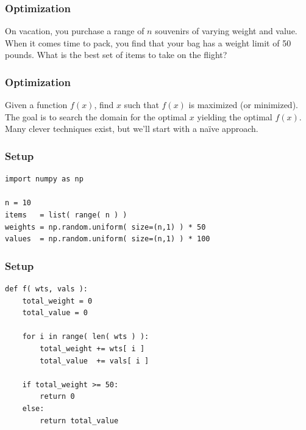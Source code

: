 \documentclass[11pt]{beamer}
\begin{document}
\begin{frame}[fragile]
  \frametitle{Optimization}
  \Enlarge

  On vacation, you purchase a range of $n$ souvenirs of varying weight and value.  When it comes time to pack, you find that your bag has a weight limit of 50 pounds.  What is the best set of items to take on the flight?
\end{frame}

\begin{frame}[fragile]
  \frametitle{Optimization}
  \Enlarge

  \begin{enumerate}
  \myitem  Given a function $f(x)$, find $x$ such that $f(x)$ is maximized (or minimized).
  \myitem  The goal is to search the domain for the optimal $x$ yielding the optimal $f(x)$.
  \myitem  Many clever techniques exist, but we'll start with a na\"{i}ve approach.
  \end{enumerate}
\end{frame}

\begin{frame}[fragile]
  \frametitle{Setup}
  \Enlarge

  \begin{Verbatim}
import numpy as np

n = 10
items   = list( range( n ) )
weights = np.random.uniform( size=(n,1) ) * 50
values  = np.random.uniform( size=(n,1) ) * 100
  \end{Verbatim}
\end{frame}

\begin{frame}[fragile]
  \frametitle{Setup}

  \begin{Verbatim}
def f( wts, vals ):
    total_weight = 0
    total_value = 0

    for i in range( len( wts ) ):
        total_weight += wts[ i ]
        total_value  += vals[ i ]

    if total_weight >= 50:
        return 0
    else:
        return total_value
  \end{Verbatim}
\end{frame}
\end{document}
